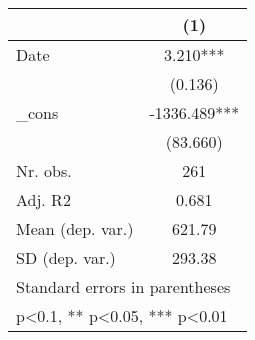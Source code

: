 {
\def\sym#1{\ifmmode^{#1}\else\(^{#1}\)\fi}
\begin{tabular}{l*{1}{c}}
\hline\hline
            &\multicolumn{1}{c}{(1)}   \\
\hline
Date        &       3.210***\\
            &     (0.136)   \\
[1em]
\_cons      &   -1336.489***\\
            &    (83.660)   \\
\hline
Nr. obs.    &         261   \\
Adj. R2     &       0.681   \\
Mean (dep. var.)&      621.79   \\
SD (dep. var.)&      293.38   \\
\hline\hline
\multicolumn{2}{l}{\footnotesize Standard errors in parentheses}\\
\multicolumn{2}{l}{\footnotesize * p<0.1, ** p<0.05, *** p<0.01}\\
\end{tabular}
}
